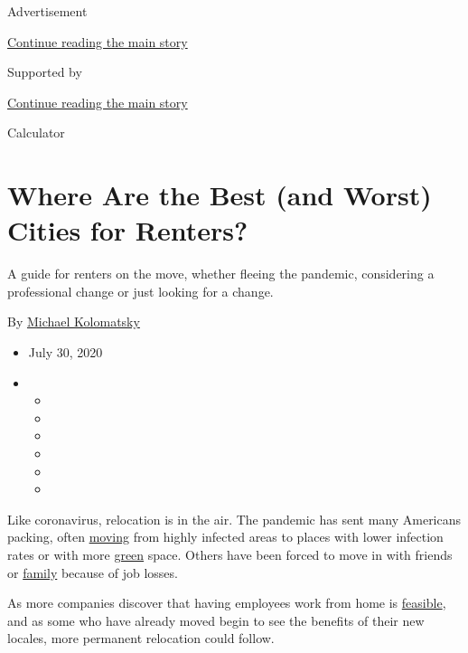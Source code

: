 Advertisement

\protect\hyperlink{after-top}{Continue reading the main story}

Supported by

\protect\hyperlink{after-sponsor}{Continue reading the main story}

Calculator

\hypertarget{where-are-the-best-and-worst-cities-for-renters}{%
\section{Where Are the Best (and Worst) Cities for
Renters?}\label{where-are-the-best-and-worst-cities-for-renters}}

A guide for renters on the move, whether fleeing the pandemic,
considering a professional change or just looking for a change.

By
\href{https://www.nytimes3xbfgragh.onion/by/michael-kolomatsky}{Michael
Kolomatsky}

\begin{itemize}
\item
  July 30, 2020
\item
  \begin{itemize}
  \item
  \item
  \item
  \item
  \item
  \item
  \end{itemize}
\end{itemize}

Like coronavirus, relocation is in the air. The pandemic has sent many
Americans packing, often
\href{https://www.nytimes3xbfgragh.onion/2020/07/28/realestate/buying-selling-moving-during-coronavirus.html}{moving}
from highly infected areas to places with lower infection rates or with
more
\href{https://www.nytimes3xbfgragh.onion/2018/12/14/realestate/forget-the-suburbs-its-country-or-bust.html}{green}
space. Others have been forced to move in with friends or
\href{https://www.nytimes3xbfgragh.onion/2020/06/25/realestate/more-adults-than-ever-live-with-parents-or-grandparents.html}{family}
because of job losses.

As more companies discover that having employees work from home is
\href{https://www.nytimes3xbfgragh.onion/2020/07/02/upshot/is-the-five-day-office-week-over.html}{feasible},
and as some who have already moved begin to see the benefits of their
new locales, more permanent relocation could follow.

